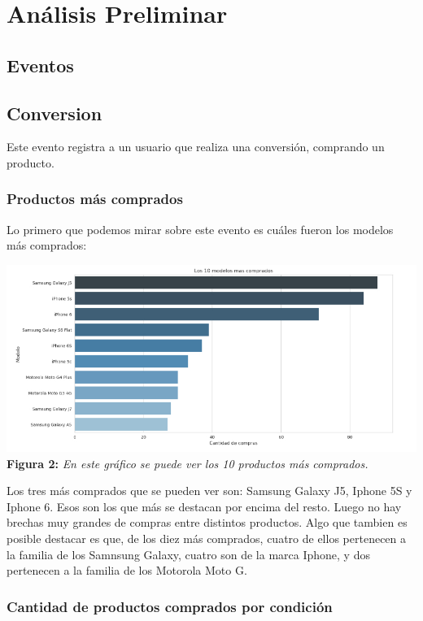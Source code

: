\documentclass[titlepage,a4paper]{article}
\begin{document}
\section{Análisis Preliminar}

\subsection{Eventos}

\subsection{Conversion}

	Este evento registra a un usuario que realiza una conversión, comprando un producto.
	
	\subsubsection{Productos más comprados}
	Lo primero que podemos mirar sobre este evento es cuáles fueron los modelos más comprados:
	
	\begin{center}
	\includegraphics[width=14cm]{imagenes/top10comprados2.jpg}\\
	\textbf{Figura 2:}  \textit{En este gráfico se puede ver los 10 productos más comprados. }
	\end{center}
	
	Los tres más comprados que se pueden ver son: Samsung Galaxy J5, Iphone 5S y Iphone 6. Esos son los que más se destacan por encima del resto. Luego no hay brechas muy grandes de compras entre distintos productos. Algo que tambien es posible destacar es que, de los diez más comprados, cuatro de ellos pertenecen a la familia de los Samnsung Galaxy, cuatro son de la marca Iphone, y dos pertenecen a la familia de los Motorola Moto G.
	
	\subsubsection{Cantidad de productos comprados por condición}
	
\end{document}
